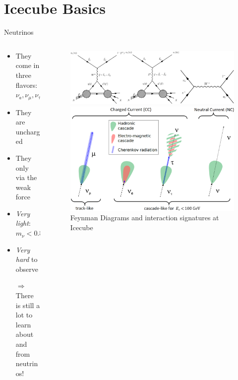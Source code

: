 \section{Icecube Basics}

%

\begin{frame}{Neutrinos}
    \begin{columns}
        \begin{column}{0.4\textwidth}
            \begin{itemize}
                \item They come in three flavors: $\nu_{\mathbb{e}}, \nu_{\mathbb{\mu}}, \nu_{\mathbb{\tau}}$
                \item They are uncharged
                \item They only via the weak force
                \item \emph{Very light}: $m_{\nu} < \SI{0.8}{\electronvolt}$\footnotemark[1]
                \item \emph{Very hard} to observe
                \item[$\Rightarrow$] There is still a lot to learn about and from neutrinos!
            \end{itemize}
        \end{column}
        \begin{column}{0.6\textwidth}
            \begin{figure}
                \centering
                \includegraphics[width=\textwidth]{media/feynman_diagrams.png}

                \includegraphics[width=.6\textwidth]{media/neutrino_interaction.png}
                \caption*{Feynman Diagrams and interaction signatures at Icecube \footnotemark[2]}
            \end{figure}
        \end{column}
    \end{columns}
\end{frame}
